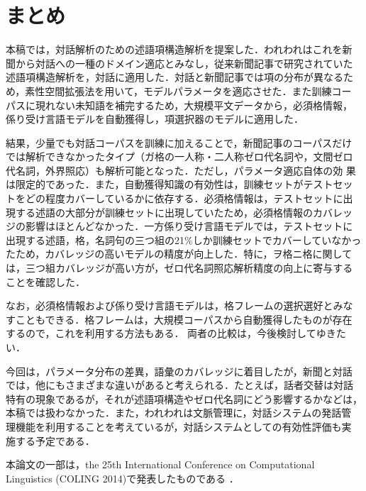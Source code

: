 \documentclass[japanese]{jnlp_1.4}
\begin{document}
\section{まとめ}
\label{sec-conclusion}

本稿では，対話解析のための述語項構造解析を提案した．われわれはこれを新
聞から対話への一種のドメイン適応とみなし，従来新聞記事で研究されていた
述語項構造解析を，対話に適用した．対話と新聞記事では項の分布が異なるた
め，素性空間拡張法を用いて，モデルパラメータを適応させた．また訓練コー
パスに現れない未知語を補完するため，大規模平文データから，必須格情報，
係り受け言語モデルを自動獲得し，項選択器のモデルに適用した．

結果，少量でも対話コーパスを訓練に加えることで，新聞記事のコーパスだけ
では解析できなかったタイプ（ガ格の一人称・二人称ゼロ代名詞や，文間ゼロ
  代名詞，外界照応）も解析可能となった．ただし，パラメータ適応自体の効
果は限定的であった．また，自動獲得知識の有効性は，訓練セットがテストセッ
トをどの程度カバーしているかに依存する．必須格情報は，テストセットに出
現する述語の大部分が訓練セットに出現していたため，必須格情報のカバレッ
ジの影響はほとんどなかった．一方係り受け言語モデルでは，テストセットに
出現する述語，格，名詞句の三つ組の21\%しか訓練セットでカバーしていなかっ
たため，カバレッジの高いモデルの精度が向上した．特に，ヲ格ニ格に関して
は，三つ組カバレッジが高い方が，ゼロ代名詞照応解析精度の向上に寄与する
ことを確認した．

なお，必須格情報および係り受け言語モデルは，格フレームの選択選好とみな
すこともできる．格フレームは，大規模コーパスから自動獲得したものが存在
するので\cite{Kawahara:CaseFrame2005j}，これを利用する方法もある．
両者の比較は，今後検討してゆきたい．

今回は，パラメータ分布の差異，語彙のカバレッジに着目したが，新聞と対話
では，他にもさまざまな違いがあると考えられる．たとえば，話者交替は対話
特有の現象であるが，それが述語項構造やゼロ代名詞にどう影響するかなどは，
本稿では扱わなかった．また，われわれは文脈管理に，対話システムの発話管
理機能を利用することを考えているが，対話システムとしての有効性評価も実
施する予定である．

\acknowledgment

本論文の一部は，the 25th International Conference on Computational
Linguistics (COLING 2014)で発表したものである
\cite{imamura-higashinaka-izumi:2014:Coling}．
\end{document}
